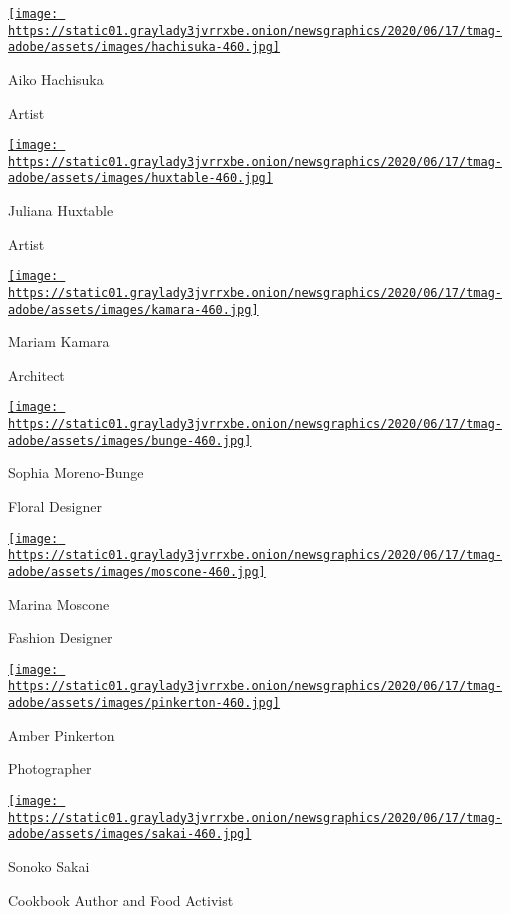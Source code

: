 \href{https://www.nytimes3xbfgragh.onion/2020/08/10/t-magazine/aiko-hachisuka-art-sculpture.html}{\texttt{[image: https://static01.graylady3jvrrxbe.onion/newsgraphics/2020/06/17/tmag-adobe/assets/images/hachisuka-460.jpg]}}

Aiko Hachisuka

Artist

\href{https://www.nytimes3xbfgragh.onion/2020/08/10/t-magazine/juliana-huxtable.html}{\texttt{[image: https://static01.graylady3jvrrxbe.onion/newsgraphics/2020/06/17/tmag-adobe/assets/images/huxtable-460.jpg]}}

Juliana Huxtable

Artist

\href{https://www.nytimes3xbfgragh.onion/2020/08/10/t-magazine/mariam-kamara-architect-design.html}{\texttt{[image: https://static01.graylady3jvrrxbe.onion/newsgraphics/2020/06/17/tmag-adobe/assets/images/kamara-460.jpg]}}

Mariam Kamara

Architect

\href{https://www.nytimes3xbfgragh.onion/2020/08/10/t-magazine/sophia-moreno-bunge-floral-design.html}{\texttt{[image: https://static01.graylady3jvrrxbe.onion/newsgraphics/2020/06/17/tmag-adobe/assets/images/bunge-460.jpg]}}

Sophia Moreno-Bunge

Floral Designer

\href{https://www.nytimes3xbfgragh.onion/2020/08/10/t-magazine/marina-moscone-fashion-design.html}{\texttt{[image: https://static01.graylady3jvrrxbe.onion/newsgraphics/2020/06/17/tmag-adobe/assets/images/moscone-460.jpg]}}

Marina Moscone

Fashion Designer

\href{https://www.nytimes3xbfgragh.onion/2020/08/10/t-magazine/amber-pinkerton-photography.html}{\texttt{[image: https://static01.graylady3jvrrxbe.onion/newsgraphics/2020/06/17/tmag-adobe/assets/images/pinkerton-460.jpg]}}

Amber Pinkerton

Photographer

\href{https://www.nytimes3xbfgragh.onion/2020/08/10/t-magazine/sonoko-sakai-chef-cooking-soba.html}{\texttt{[image: https://static01.graylady3jvrrxbe.onion/newsgraphics/2020/06/17/tmag-adobe/assets/images/sakai-460.jpg]}}

Sonoko Sakai

Cookbook Author and Food Activist

